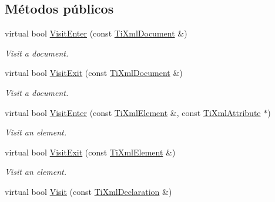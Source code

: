 \subsection*{Métodos públicos}
\begin{DoxyCompactItemize}
\item 
\hypertarget{class_ti_xml_visitor_a07baecb52dd7d8716ae2a48ad0956ee0}{virtual bool \hyperlink{class_ti_xml_visitor_a07baecb52dd7d8716ae2a48ad0956ee0}{Visit\-Enter} (const \hyperlink{class_ti_xml_document}{Ti\-Xml\-Document} \&)}\label{class_ti_xml_visitor_a07baecb52dd7d8716ae2a48ad0956ee0}

\begin{DoxyCompactList}\small\item\em Visit a document. \end{DoxyCompactList}\item 
\hypertarget{class_ti_xml_visitor_aa0ade4f27087447e93974e975c3246ad}{virtual bool \hyperlink{class_ti_xml_visitor_aa0ade4f27087447e93974e975c3246ad}{Visit\-Exit} (const \hyperlink{class_ti_xml_document}{Ti\-Xml\-Document} \&)}\label{class_ti_xml_visitor_aa0ade4f27087447e93974e975c3246ad}

\begin{DoxyCompactList}\small\item\em Visit a document. \end{DoxyCompactList}\item 
\hypertarget{class_ti_xml_visitor_af6c6178ffa517bbdba95d70490875fff}{virtual bool \hyperlink{class_ti_xml_visitor_af6c6178ffa517bbdba95d70490875fff}{Visit\-Enter} (const \hyperlink{class_ti_xml_element}{Ti\-Xml\-Element} \&, const \hyperlink{class_ti_xml_attribute}{Ti\-Xml\-Attribute} $\ast$)}\label{class_ti_xml_visitor_af6c6178ffa517bbdba95d70490875fff}

\begin{DoxyCompactList}\small\item\em Visit an element. \end{DoxyCompactList}\item 
\hypertarget{class_ti_xml_visitor_aec2b1f8116226d52f3a1b95dafd3a32c}{virtual bool \hyperlink{class_ti_xml_visitor_aec2b1f8116226d52f3a1b95dafd3a32c}{Visit\-Exit} (const \hyperlink{class_ti_xml_element}{Ti\-Xml\-Element} \&)}\label{class_ti_xml_visitor_aec2b1f8116226d52f3a1b95dafd3a32c}

\begin{DoxyCompactList}\small\item\em Visit an element. \end{DoxyCompactList}\item 
\hypertarget{class_ti_xml_visitor_afad71c71ce6473fb9b4b64cd92de4a19}{virtual bool \hyperlink{class_ti_xml_visitor_afad71c71ce6473fb9b4b64cd92de4a19}{Visit} (const \hyperlink{class_ti_xml_declaration}{Ti\-Xml\-Declaration} \&)}\label{class_ti_xml_visitor_afad71c71ce6473fb9b4b64cd92de4a19}


\end{DoxyCompactItemize}
